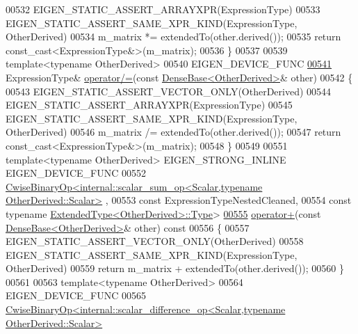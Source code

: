\begin{DoxyCode}
00532       EIGEN\_STATIC\_ASSERT\_ARRAYXPR(ExpressionType)
00533       EIGEN\_STATIC\_ASSERT\_SAME\_XPR\_KIND(ExpressionType, OtherDerived)
00534       m\_matrix *= extendedTo(other.derived());
00535       \textcolor{keywordflow}{return} \textcolor{keyword}{const\_cast<}ExpressionType&\textcolor{keyword}{>}(m\_matrix);
00536     \}
00537 
00539     \textcolor{keyword}{template}<\textcolor{keyword}{typename} OtherDerived>
00540     EIGEN\_DEVICE\_FUNC
\hyperlink{group___core___module_ac04267f84ef1c52d88f452667cf757ae}{00541}     ExpressionType& \hyperlink{group___core___module_ac04267f84ef1c52d88f452667cf757ae}{operator/=}(\textcolor{keyword}{const} \hyperlink{group___core___module_class_eigen_1_1_dense_base}{DenseBase<OtherDerived>}& other)
00542     \{
00543       EIGEN\_STATIC\_ASSERT\_VECTOR\_ONLY(OtherDerived)
00544       EIGEN\_STATIC\_ASSERT\_ARRAYXPR(ExpressionType)
00545       EIGEN\_STATIC\_ASSERT\_SAME\_XPR\_KIND(ExpressionType, OtherDerived)
00546       m\_matrix /= extendedTo(other.derived());
00547       \textcolor{keywordflow}{return} \textcolor{keyword}{const\_cast<}ExpressionType&\textcolor{keyword}{>}(m\_matrix);
00548     \}
00549 
00551     \textcolor{keyword}{template}<\textcolor{keyword}{typename} OtherDerived> EIGEN\_STRONG\_INLINE EIGEN\_DEVICE\_FUNC
00552     \hyperlink{group___core___module_class_eigen_1_1_cwise_binary_op}{CwiseBinaryOp<internal::scalar\_sum\_op<Scalar,typename OtherDerived::Scalar>}
      ,
00553                   \textcolor{keyword}{const} ExpressionTypeNestedCleaned,
00554                   \textcolor{keyword}{const} \textcolor{keyword}{typename} \hyperlink{group___core___module_class_eigen_1_1_replicate}{ExtendedType<OtherDerived>::Type}>
\hyperlink{group___core___module_ad38bb674b896bfc8f96baeb487aa2184}{00555}     \hyperlink{group___core___module_ad38bb674b896bfc8f96baeb487aa2184}{operator+}(\textcolor{keyword}{const} \hyperlink{group___core___module_class_eigen_1_1_dense_base}{DenseBase<OtherDerived>}& other)\textcolor{keyword}{ const}
00556 \textcolor{keyword}{    }\{
00557       EIGEN\_STATIC\_ASSERT\_VECTOR\_ONLY(OtherDerived)
00558       EIGEN\_STATIC\_ASSERT\_SAME\_XPR\_KIND(ExpressionType, OtherDerived)
00559       \textcolor{keywordflow}{return} m\_matrix + extendedTo(other.derived());
00560     \}
00561 
00563     \textcolor{keyword}{template}<\textcolor{keyword}{typename} OtherDerived>
00564     EIGEN\_DEVICE\_FUNC
00565     
      \hyperlink{group___core___module_class_eigen_1_1_cwise_binary_op}{CwiseBinaryOp<internal::scalar\_difference\_op<Scalar,typename OtherDerived::Scalar>}

\end{DoxyCode}
